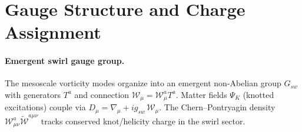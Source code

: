\documentclass[smallextended]{svjour3}       %
\begin{document}
	\section{Gauge Structure and Charge Assignment}

	\paragraph{Emergent swirl gauge group.}
	The mesoscale vorticity modes organize into an emergent non-Abelian group \(G_{\!sw}\) with generators \(T^a\) and connection \(\mathcal{W}_\mu=\mathcal{W}_\mu^a T^a\).
	Matter fields \(\Psi_K\) (knotted excitations) couple via \(D_\mu=\nabla_\mu+i g_{\!sw}\,\mathcal{W}_\mu\).
	The Chern–Pontryagin density \(\mathcal{W}_{\mu\nu}^a\tilde{\mathcal{W}}^{a\mu\nu}\) tracks conserved knot/helicity charge in the swirl sector.
\end{document}

